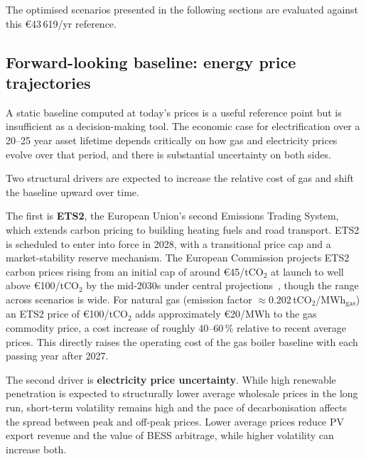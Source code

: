\documentclass[11pt,a4paper]{report}
\begin{document}
The optimised scenarios presented in the following sections are evaluated against
this \euro{}43\,619/yr reference.

\subsection{Forward-looking baseline: energy price trajectories}
\label{sub:baseline_forward}

A static baseline computed at today's prices is a useful reference point but is
insufficient as a decision-making tool.
The economic case for electrification over a 20--25 year asset lifetime depends
critically on how gas and electricity prices evolve over that period, and there is
substantial uncertainty on both sides.

Two structural drivers are expected to increase the relative cost of gas and shift
the baseline upward over time.

The first is \textbf{ETS2}, the European Union's second Emissions Trading System,
which extends carbon pricing to building heating fuels and road transport.
ETS2 is scheduled to enter into force in 2028, with a transitional price cap and
a market-stability reserve mechanism.
The European Commission projects ETS2 carbon prices rising from an initial
cap of around \euro{45}/tCO$_2$ at launch to well above \euro{100}/tCO$_2$ by
the mid-2030s under central projections~\cite{EuropeanCommission2021fitfor55},
though the range across scenarios is wide.
For natural gas (emission factor $\approx 0.202$\,tCO$_2$/MWh$_\mathrm{gas}$)
an ETS2 price of \euro{100}/tCO$_2$ adds approximately \euro{20}/MWh to the
gas commodity price, a cost increase of roughly 40--60\,\% relative to recent
average prices.
This directly raises the operating cost of the gas boiler baseline with each
passing year after 2027.

The second driver is \textbf{electricity price uncertainty}.
While high renewable penetration is expected to structurally lower average wholesale
prices in the long run, short-term volatility remains high and the pace of
decarbonisation affects the spread between peak and off-peak prices.
Lower average prices reduce PV export revenue and the value of BESS arbitrage,
while higher volatility can increase both.
\end{document}
